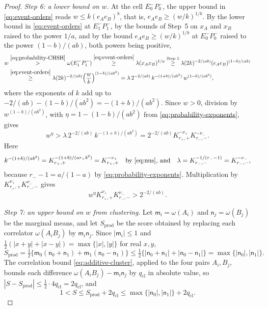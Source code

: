 \documentclass[11pt]{amsart}
\numberwithin{equation}{section}
\theoremstyle{definition}
\begin{document}
\begin{proof}
\smallskip
\emph{Step 6: a lower bound on \(w\).} At the cell \(E_0^-P_0^-\), the upper
bound in \eqref{eq:event-orders} reads \(w\le k(e_Ae_B)^b\), that is,
\(e_Ae_B\ge(w/k)^{1/b}\). By the lower
bound in \eqref{eq:event-orders} at \(E_1^-P_1^-\), by the bounds of Step~5
on \(x_A\) and \(x_B\) raised to the power \(1/a\), and by the bound
\(e_Ae_B\ge(w/k)^{1/b}\) at \(E_0^-P_0^-\) raised to the power \((1-b)/(ab)\), both powers being
positive,
\begin{align*}
 w&\overset{\eqref{eq:probability-CHSH}}{>}\omega(E_1^-P_1^-)
 \overset{\eqref{eq:event-orders}}{\ge}\lambda(x_Ax_B)^{1/a}
 \overset{\text{Step 5}}{\ge}\lambda(2k)^{-2/(ab)}(e_Ae_B)^{(1-b)/(ab)}\\
 &\overset{\eqref{eq:event-orders}}{\ge}
 \lambda(2k)^{-2/(ab)}\Bigl(\frac wk\Bigr)^{(1-b)/(ab^2)}
 =\lambda\,2^{-2/(ab)}\,k^{-(1+b)/(ab^2)}\,w^{(1-b)/(ab^2)},
\end{align*}
where the exponents of \(k\) add up to
\(-2/(ab)-(1-b)/(ab^2)=-(1+b)/(ab^2)\). Since \(w>0\), division by
\(w^{(1-b)/(ab^2)}\), with \(\eta=1-(1-b)/(ab^2)\) from
\eqref{eq:probability-exponents}, gives
\[
 w^\eta>\lambda\,2^{-2/(ab)}\,k^{-(1+b)/(ab^2)}
 =2^{-2/(ab)}K_{r_+,+}^{-\nu_+}K_{r_-,-}^{-\nu_-}.
\]
Here
\[
 k^{-(1+b)/(ab^2)}=K_{r_+,+}^{-(1+b)/(ar_+b^2)}=K_{r_+,+}^{-\nu_+}
 \quad\text{by \eqref{eq:nus}, and}\quad
 \lambda=K_{r_-,-}^{-1/(r_--1)}=K_{r_-,-}^{-\nu_-},
\]
because
\(r_--1=a/(1-a)\) by \eqref{eq:probability-exponents}. Multiplication by
\(K_{r_+,+}^{\nu_+}K_{r_-,-}^{\nu_-}\) gives
\begin{equation}
 w^\eta K_{r_+,+}^{\nu_+}K_{r_-,-}^{\nu_-}
 >2^{-2/(ab)}.
 \label{eq:necessary-cell}
\end{equation}

\smallskip
\emph{Step 7: an upper bound on \(w\) from clustering.} Let
\(\mathsf m_i=\omega(A_i)\) and \(\mathsf n_j=\omega(B_j)\) be the
marginal means, and let \(S_{\mathrm{prod}}\) be the score obtained by
replacing each correlator \(\omega(A_iB_j)\) by
\(\mathsf m_i\mathsf n_j\). Since \(|\mathsf m_i|\le1\) and
\(\frac12(|x+y|+|x-y|)=\max\{|x|,|y|\}\) for real \(x,y\),
\[
 S_{\mathrm{prod}}
 =\tfrac12\{\mathsf m_0(\mathsf n_0+\mathsf n_1)
             +\mathsf m_1(\mathsf n_0-\mathsf n_1)\}
 \le\tfrac12\{|\mathsf n_0+\mathsf n_1|+|\mathsf n_0-\mathsf n_1|\}
 =\max\{|\mathsf n_0|,|\mathsf n_1|\}.
\]
The correlation bound \eqref{eq:additive-cluster}, applied to the four
pairs \(A_i,B_j\), bounds each difference
\(\omega(A_iB_j)-\mathsf m_i\mathsf n_j\) by \(q_{\mathrm{cl}}\) in
absolute value, so
\(|S-S_{\mathrm{prod}}|\le\frac12\cdot4q_{\mathrm{cl}}=2q_{\mathrm{cl}}\),
and
\[
 1<S\le S_{\mathrm{prod}}+2q_{\mathrm{cl}}
 \le\max\{|\mathsf n_0|,|\mathsf n_1|\}+2q_{\mathrm{cl}}.
\]


\end{proof}
\end{document}
